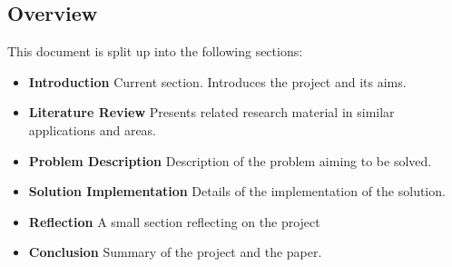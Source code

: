 \subsection{Overview}
This document is split up into the following sections:
\begin{itemize}
 \item \textbf{Introduction} Current section. Introduces the project and its aims.
 \item \textbf{Literature Review} Presents related research material in similar applications and areas.
 \item \textbf{Problem Description} Description of the problem aiming to be solved.
 \item \textbf{Solution Implementation} Details of the implementation of the solution.
 \item \textbf{Reflection} A small section reflecting on the project
 \item \textbf{Conclusion} Summary of the project and the paper.
\end{itemize}





